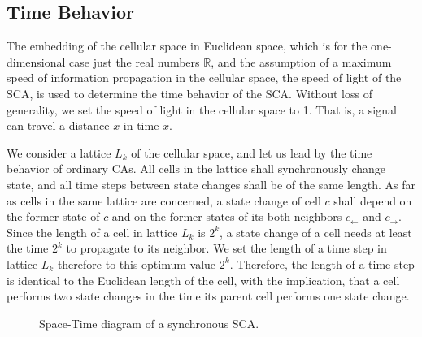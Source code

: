 \documentclass[pre,amssymb,showpacs,showkeys,preprint]{revtex4}
\begin{document}
\subsection{Time Behavior}

The embedding of the cellular space in Euclidean space,
which is for the one-dimensional case just the real numbers $\mathbb R$,
and the assumption of a maximum speed
of information propagation in the cellular space, the speed of light of the SCA, is used to
determine the time behavior of the SCA.
Without loss of generality, we set the speed of light in the cellular space to 1.
That is, a signal can travel a distance $x$ in time $x$.

We consider a lattice $L_k$ of the cellular space, and let us lead by the time behavior of
ordinary CAs.
All cells in the lattice shall synchronously change state, and all time steps between state changes
shall be of the same length.
As far as cells in the same lattice are concerned, a state change of cell $c$ shall depend on
the former state of $c$ and on the former states of its
both neighbors $c_\leftarrow$ and $c_\rightarrow$.
Since the length of a cell in lattice $L_k$ is $2^k$, a state change of a cell needs at least
the time $2^k$ to propagate to its neighbor.
We set the length of a time step in lattice $L_k$ therefore to this optimum value $2^k$.
Therefore, the length of a time step is identical to the Euclidean length of the cell, with the
implication, that a cell performs two state changes in the time its parent cell performs one state
change.

\begin{figure}
\begin{center}
\caption{\label{fig:synchronous-space-time} Space-Time diagram of a synchronous SCA.}
\end{center}
\end{figure}
\end{document}
